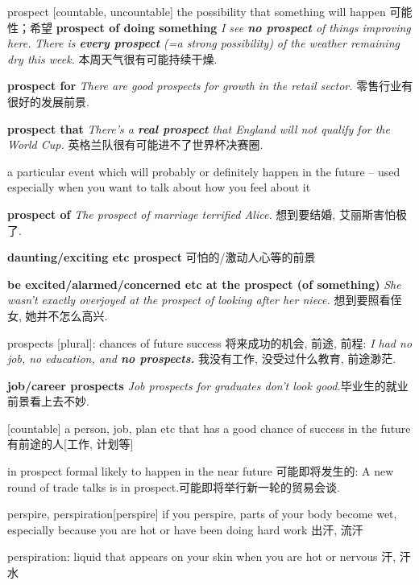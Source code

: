 \begin{DefWord}{prospect}
    [countable, uncountable] the possibility that something will happen 可能性；希望
    \textbf{prospect of doing something}
    \textit{I see \textbf{no prospect} of things improving here.}
    \textit{There is \textbf{every prospect} (=a strong possibility) of the weather remaining dry this week.} 本周天气很有可能持续干燥. 
    
    \textbf{prospect for}
    \textit{There are good prospects for growth in the retail sector.} 零售行业有很好的发展前景. 

    \textbf{prospect that}
    \textit{There's a \textbf{real prospect} that England will not qualify for the World Cup.} 英格兰队很有可能进不了世界杯决赛圈. 

    a particular event which will probably or definitely happen in the future – used especially when you want to talk about how you feel about it

    \textbf{prospect of}
    \textit{The prospect of marriage terrified Alice.} 想到要结婚, 艾丽斯害怕极了. 
    
\textbf{daunting/exciting etc prospect} 可怕的/激动人心等的前景

\textbf{be excited/alarmed/concerned etc at the prospect (of something)}
 \textit{She wasn't exactly overjoyed at the prospect of looking after her niece.} 想到要照看侄女, 她并不怎么高兴. 

prospects [plural]: chances of future success 将来成功的机会, 前途, 前程:
 \textit{I had no job, no education, and \textbf{no prospects.}} 我没有工作, 没受过什么教育, 前途渺茫. 

\textbf{job/career prospects}
 \textit{Job prospects for graduates don't look good.}毕业生的就业前景看上去不妙. 

[countable] a person, job, plan etc that has a good chance of success in the future 有前途的人[工作, 计划等]

in prospect formal likely to happen in the near future 可能即将发生的:
 A new round of trade talks is in prospect.可能即将举行新一轮的贸易会谈. 
\end{DefWord}

\begin{RefWord}{perspire, perspiration}[perspire]
    if you perspire, parts of your body become wet, especially because you are hot or have been doing hard work 出汗, 流汗

    perspiration: liquid that appears on your skin when you are hot or nervous 汗, 汗水
\end{RefWord}

